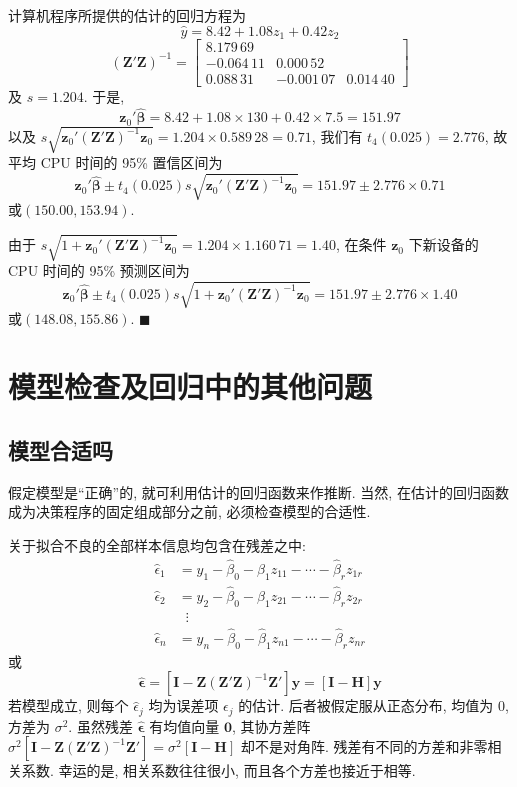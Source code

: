 
计算机程序所提供的估计的回归方程为
\[
\hat{y}=8.42+1.08z_1+0.42z_2
\]
\[
(\mathbf{Z}'\mathbf{Z})^{-1}=\begin{bmatrix}8.179\,69&&\\-0.064\,11&0.000\,52&\\0.088\,31&-0.001\,07&0.014\,40\end{bmatrix}
\]
及 $s=1.204$. 于是,
\[
\mathbf{z}_0'\hat{\boldsymbol{\beta}}=8.42+1.08\times130+0.42\times7.5=151.97
\]
以及 $s\sqrt{\mathbf{z}_0'(\mathbf{Z}'\mathbf{Z})^{-1}\mathbf{z}_0}=1.204\times0.589\,28=0.71$, 我们有 $t_4(0.025)=2.776$, 故平均 CPU 时间的 95\% 置信区间为
\[
\mathbf{z}_0'\hat{\boldsymbol{\beta}}\pm t_4(0.025)s\sqrt{\mathbf{z}_0'(\mathbf{Z}'\mathbf{Z})^{-1}\mathbf{z}_0}=151.97\pm2.776\times0.71
\]
或$(150.00,153.94)$.

由于 $s\sqrt{1+\mathbf{z}_0'(\mathbf{Z}'\mathbf{Z})^{-1}\mathbf{z}_0}=1.204\times1.160\,71=1.40$, 在条件 $\mathbf{z}_0$ 下新设备的 CPU 时间的 95\% 预测区间为
\[
\mathbf{z}_0'\hat{\boldsymbol{\beta}}\pm t_4(0.025)s\sqrt{1+\mathbf{z}_0'(\mathbf{Z}'\mathbf{Z})^{-1}\mathbf{z}_0}=151.97\pm2.776\times1.40
\]
或$(148.08,155.86)$. \hfill$\blacksquare$

\section{模型检查及回归中的其他问题}
\label{sec:7.6}

\subsection{模型合适吗}

假定模型是``正确''的, 就可利用估计的回归函数来作推断. 当然, 在估计的回归函数成为决策程序的固定组成部分之前, 必须检查模型的合适性.

关于拟合不良的全部样本信息均包含在残差之中:
\[
\begin{aligned}
\hat{\epsilon}_1&=y_1-\hat{\beta}_0-\hat{\beta}_1z_{11}-\cdots-\hat{\beta}_rz_{1r}\\
\hat{\epsilon}_2&=y_2-\hat{\beta}_0-\hat{\beta}_1z_{21}-\cdots-\hat{\beta}_rz_{2r}\\
&\;\;\vdots\\
\hat{\epsilon}_n&=y_n-\hat{\beta}_0-\hat{\beta}_1z_{n1}-\cdots-\hat{\beta}_rz_{nr}
\end{aligned}
\]
或
\label{eq:7-16}
\begin{equation}
\hat{\boldsymbol{\epsilon}}=[\mathbf{I}-\mathbf{Z}(\mathbf{Z}'\mathbf{Z})^{-1}\mathbf{Z}']\mathbf{y}=[\mathbf{I}-\mathbf{H}]\mathbf{y} \tag{7-16}
\end{equation}
若模型成立, 则每个 $\hat{\epsilon}_j$ 均为误差项 $\epsilon_j$ 的估计. 后者被假定服从正态分布, 均值为 0, 方差为 $\sigma^2$. 虽然残差 $\hat{\boldsymbol{\epsilon}}$ 有均值向量 $\mathbf{0}$, 其协方差阵 $\sigma^2[\mathbf{I}-\mathbf{Z}(\mathbf{Z}'\mathbf{Z})^{-1}\mathbf{Z}']=\sigma^2[\mathbf{I}-\mathbf{H}]$ 却不是对角阵. 残差有不同的方差和非零相关系数. 幸运的是, 相关系数往往很小, 而且各个方差也接近于相等.

